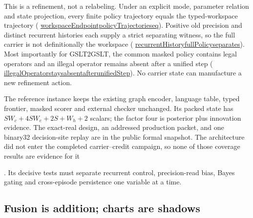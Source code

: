 \documentclass[11pt]{article}
\newcommand{\leanname}[1]{{\scriptsize\ttfamily
  \def\_{\textunderscore\allowbreak}#1}}
\newcommand{\formalcommit}{f3a31db36bb2f944312ee31c1d86c2758109e83a}
\newcommand{\leansource}[3]{%
  \href{https://github.com/zariuq/MeTTapedia/blob/\formalcommit/#1\#L#2}{\leanname{#3}}}
\newif\ifoeisterminalfacts
\begin{document}
This is a refinement, not a relabeling. Under an explicit mode, parameter relation and
state projection, every finite policy trajectory equals the typed-workspace trajectory
(\leansource{lean/mettapedia/Mettapedia/MachineLearning/NeuralNetworks/UnifiedCarrier/StateCarrier.lean}{246-L278}{workspaceEndpoint\_policyTrajectories\_eq}).
Positive old precision and distinct recurrent histories each supply a strict separating
witness, so the full carrier is not definitionally the workspace
(\leansource{lean/mettapedia/Mettapedia/MachineLearning/NeuralNetworks/UnifiedCarrier/StateCarrier.lean}{283-L303}{recurrentHistory\_fullPolicy\_separates}).
Most importantly for GSLT2GSLT, the common masked policy contains legal operators and an
illegal operator remains absent after a unified step
(\leansource{lean/mettapedia/Mettapedia/MachineLearning/NeuralNetworks/UnifiedCarrier/StateCarrier.lean}{306-L339}{illegalOperator\_stays\_absent\_after\_unifiedStep}).
No carrier state can manufacture a new refinement action.

The reference instance keeps the existing graph encoder, language table, typed frontier,
masked scorer and external checker unchanged. Its packed state has
$S W_c+4S W_e+2S+W_h+2$ scalars; the factor four is posterior plus innovation evidence.
The exact-real design, an addressed production packet, and one binary32 decision-site
replay are in the public formal snapshot. The architecture did not enter the completed
carrier--credit campaign, so none of those coverage results are evidence for it%
\ifoeisterminalfacts
; it did enter a subsequent mis-specified branch whose record is tabulated in
Section~\ref{sec:gslt-terminal}%
\fi
. Its decisive tests must
separate recurrent control, precision-read bias, Bayes gating and cross-episode persistence
one variable at a time.

\subsection{Fusion is addition; charts are shadows}
\label{sec:fusion}
\end{document}
